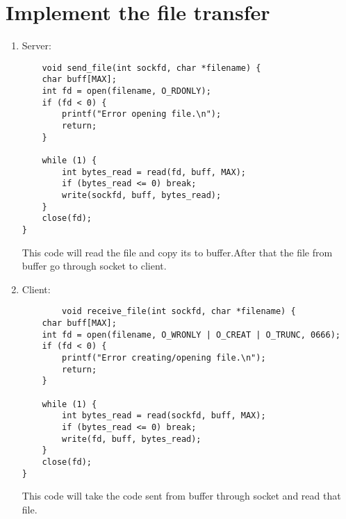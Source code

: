 \documentclass{article}
\begin{document}
\section{Implement the file transfer}
\begin{enumerate}
    \item Server:\\
    \begin{lstlisting}
    void send_file(int sockfd, char *filename) {
    char buff[MAX];
    int fd = open(filename, O_RDONLY);
    if (fd < 0) {
        printf("Error opening file.\n");
        return;
    }

    while (1) {
        int bytes_read = read(fd, buff, MAX);
        if (bytes_read <= 0) break;
        write(sockfd, buff, bytes_read);
    }
    close(fd);
}

\end{lstlisting}
This code will read the file and copy its to buffer.After that the file from buffer go through socket to client.
    \item Client:
    \begin{lstlisting}
        void receive_file(int sockfd, char *filename) {
    char buff[MAX];
    int fd = open(filename, O_WRONLY | O_CREAT | O_TRUNC, 0666);
    if (fd < 0) {
        printf("Error creating/opening file.\n");
        return;
    }

    while (1) {
        int bytes_read = read(sockfd, buff, MAX);
        if (bytes_read <= 0) break;
        write(fd, buff, bytes_read);
    }
    close(fd);
}
    \end{lstlisting}
This code will take the code sent from buffer through socket and read that file.
\end{enumerate}
\end{document}
